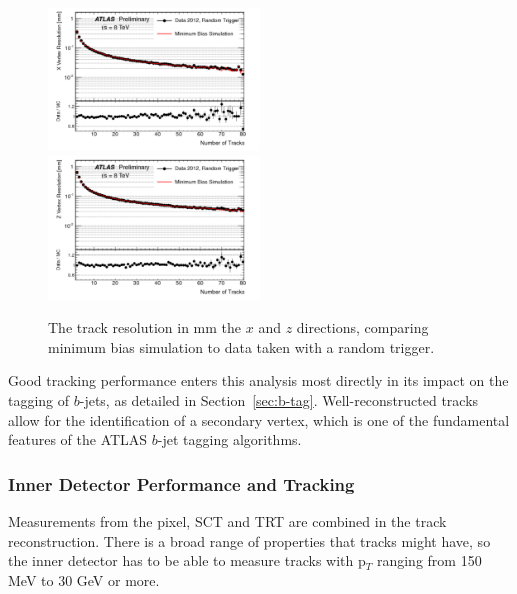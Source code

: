 \begin{figure}
	\includegraphics[width=0.5\textwidth]{ReconstructionPerformance/images/track_perf3.pdf}
	\includegraphics[width=0.5\textwidth]{ReconstructionPerformance/images/track_perf4.pdf}
	\label{fig:track_perfB}  
	\caption{The track resolution in mm the $x$ and $z$ directions, comparing minimum bias simulation to data taken with a random trigger.}
\end{figure}

Good tracking performance enters this analysis most directly in its impact on the tagging of $b$-jets, as detailed in Section~\ref{sec:b-tag}.  Well-reconstructed tracks allow for the identification of a secondary vertex, which is one of the fundamental features of the ATLAS $b$-jet tagging algorithms.


\subsubsection{Inner Detector Performance and Tracking}
\label{sec:id_perf}
Measurements from the pixel, SCT and TRT are combined in the track reconstruction.  There is a broad range 
of properties that tracks might have, so the inner detector has to be able to measure tracks with p$_T$
 ranging from 150 MeV to 30 GeV or more.   

